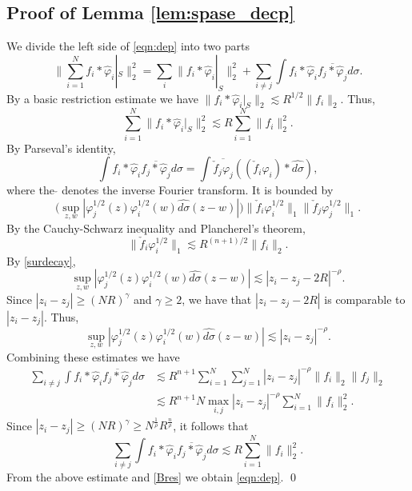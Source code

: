 \documentclass[11pt,reqno]{amsart}
\theoremstyle{plain}
\theoremstyle{definition}
\theoremstyle{remark}
\numberwithin{equation}{section}
\begin{document}
\subsection{Proof of Lemma \ref{lem:spase_decp}}
We divide the left side of \eqref{eqn:dep} into two parts
\[
\| \sum_{i=1}^{N} f_i \ast \hat \varphi_i |_{S} \|_2^2 
= \sum_{i} \|f_i \ast \hat \varphi_i |_{S} \|_2^2
+ \sum_{i \neq j} \int f_i \ast \hat \varphi_i  \overline{f_j \ast \hat \varphi_j} d\sigma.
\]
By a basic restriction estimate we have $\| f_i \ast \hat \varphi_i |_{S}\|_2  \lesssim R^{1/2} \|f_i\|_2$. Thus,
\begin{equation} \label{Bres}
\sum_{i=1}^{N} \| f_i \ast \hat \varphi_i |_{S}\|_2^2  \lesssim R \sum_{i=1}^{N}  \|f_i\|_2^2.
\end{equation}
By Parseval's identity,
\[
 \int f_i \ast \hat \varphi_i  \overline{f_j \ast \hat \varphi_j} d\sigma 
= \int \overline{\check f_j \varphi_j} ((\check f_i \varphi_i)  \ast \widehat{d\sigma}),
\] where the $\check{ }$ denotes the inverse Fourier transform.
It is bounded by
\[
\big(\sup_{z,w} | \varphi_j^{1/2}(z)  \varphi^{1/2}_i(w)   \widehat{d\sigma}(z-w) | \big)  \|\check f_i \varphi^{1/2}_i\|_1 \|\check f_j \varphi^{1/2}_j\|_1.
\]
By the Cauchy-Schwarz inequality and Plancherel's theorem,
\[
\|\check f_i \varphi^{1/2}_i \|_{1} \lesssim R^{(n+1)/2} \| f_i\|_{2}.
\]
By \eqref{surdecay},
\[
\sup_{z,w} | \varphi^{1/2}_j(z)  \varphi^{1/2}_i(w)   \widehat{d\sigma}(z-w) | \lesssim |z_i-z_j-2R|^{-\rho}.
\]
Since $|z_i-z_j| \ge (NR)^{\gamma}$ and $\gamma \ge 2$, we have that $|z_i-z_j-2R|$ is comparable to $|z_i-z_j|$. Thus,
\[
\sup_{z,w} | \varphi^{1/2}_j(z)  \varphi^{1/2}_i(w)   \widehat{d\sigma}(z-w) | \lesssim |z_i-z_j|^{-\rho}.
\]
Combining these estimates we have
\begin{align*}
\sum_{i \neq j} \int f_i \ast \hat \varphi_i  \overline{f_j \ast \hat \varphi_j} d\sigma &\lesssim R^{n+1} \sum_{i=1}^{N}\sum_{j=1}^{N} |z_i-z_j|^{-\rho} \| f_i\|_{2} \| f_j\|_{2} \\
&\lesssim R^{n+1} N \max_{i,j} |z_i-z_j|^{-\rho} \sum_{i=1}^{N} \| f_i\|_{2}^2.
\end{align*}
Since $|z_i-z_j| \ge (NR)^{\gamma} \ge N^{\frac{1}{\rho}}R^{\frac{n}{\rho}}$, it follows that
\[
\sum_{i \neq j} \int f_i \ast \hat \varphi_i  \overline{f_j \ast \hat \varphi_j} d\sigma \lesssim R \sum_{i=1}^{N} \| f_i\|_{2}^2.
\]
From the above estimate and \eqref{Bres} we obtain \eqref{eqn:dep}.
\qed
\end{document}
